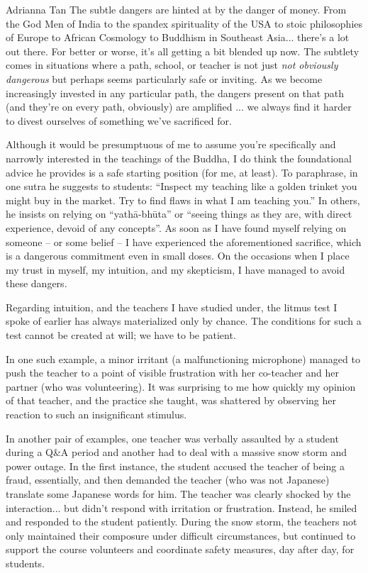 \documentclass{letter}
\newcommand\hr{\par\vspace{-.5\ht\strutbox}\noindent\hrulefill\par}
\begin{document}
\begin{letter}{Adrianna Tan}
The subtle dangers are hinted at by the danger of money.
From the God Men of India to the spandex spirituality of the USA to stoic philosophies of Europe to African Cosmology to Buddhism in Southeast Asia... there's a lot out there.
For better or worse, it's all getting a bit blended up now.
The subtlety comes in situations where a path, school, or teacher is not just \textit{not obviously dangerous} but perhaps seems particularly safe or inviting.
As we become increasingly invested in any particular path, the dangers present on that path (and they're on every path, obviously) are amplified ... we always find it harder to divest ourselves of something we've sacrificed for.

Although it would be presumptuous of me to assume you're specifically and narrowly interested in the teachings of the Buddha, I do think the foundational advice he provides is a safe starting position (for me, at least).
To paraphrase, in one sutra he suggests to students: ``Inspect my teaching like a golden trinket you might buy in the market. Try to find flaws in what I am teaching you.''
In others, he insists on relying on ``yathā-bhūta'' or ``seeing things as they are, with direct experience, devoid of any concepts''.
As soon as I have found myself relying on someone -- or some belief -- I have experienced the aforementioned sacrifice, which is a dangerous commitment even in small doses.
On the occasions when I place my trust in myself, my intuition, and my skepticism, I have managed to avoid these dangers.

\hr

Regarding intuition, and the teachers I have studied under, the litmus test I spoke of earlier has always materialized only by chance.
The conditions for such a test cannot be created at will; we have to be patient.

In one such example, a minor irritant (a malfunctioning microphone) managed to push the teacher to a point of visible frustration with her co-teacher and her partner (who was volunteering).
It was surprising to me how quickly my opinion of that teacher, and the practice she taught, was shattered by observing her reaction to such an insignificant stimulus.

In another pair of examples, one teacher was verbally assaulted by a student during a Q\&A period and another had to deal with a massive snow storm and power outage.
In the first instance, the student accused the teacher of being a fraud, essentially, and then demanded the teacher (who was not Japanese) translate some Japanese words for him.
The teacher was clearly shocked by the interaction... but didn't respond with irritation or frustration.
Instead, he smiled and responded to the student patiently.
During the snow storm, the teachers not only maintained their composure under difficult circumstances, but continued to support the course volunteers and coordinate safety measures, day after day, for students.


\end{letter}
\end{document}
